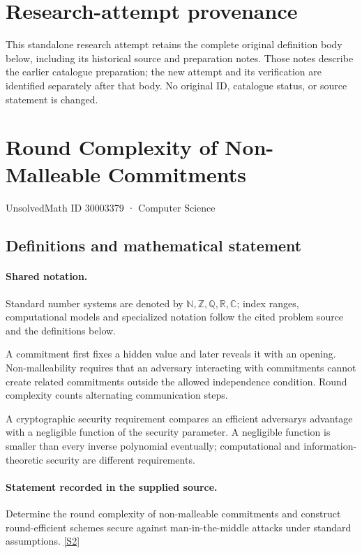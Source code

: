 \documentclass[11pt]{article}
\begin{document}
\section*{Research-attempt provenance}
This standalone research attempt retains the complete original definition body below,
including its historical source and preparation notes. Those notes describe the
earlier catalogue preparation; the new attempt and its verification are identified
separately after that body. No original ID, catalogue status, or source statement is changed.

\section{Round Complexity of Non-Malleable Commitments}\label{30003379}
{\small UnsolvedMath ID 30003379 · Computer Science}
\subsection{Definitions and mathematical statement}

\paragraph{Shared notation.}Standard number systems are denoted by $\mathbb N,\mathbb Z,\mathbb Q,\mathbb R,\mathbb C$; index ranges, computational models and specialized notation follow the cited problem source and the definitions below.


A commitment first fixes a hidden value and later reveals it with an opening. Non-malleability requires that an adversary interacting with commitments cannot create related commitments outside the allowed independence condition. Round complexity counts alternating communication steps.

A cryptographic security requirement compares an efficient adversary\textquotesingle s advantage with a negligible function of the security parameter. A negligible function is smaller than every inverse polynomial eventually; computational and information-theoretic security are different requirements.
\paragraph{Statement recorded in the supplied source.}
Determine the round complexity of non-malleable commitments and construct round-efficient schemes secure against man-in-the-middle attacks under standard assumptions. \href{https://doi.org/10.4171/owr/2017/5}{[S2]}
\end{document}
